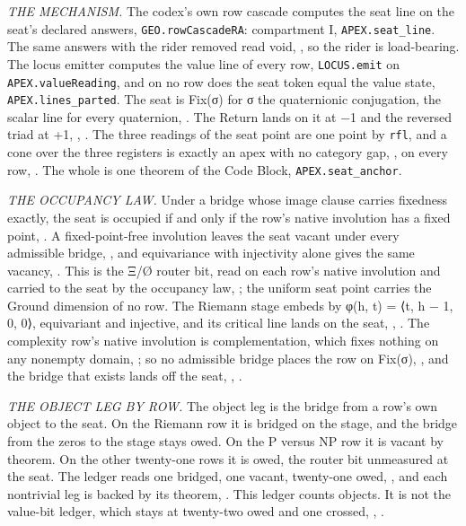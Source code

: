 \documentclass[10pt,twocolumn]{article}
\begin{document}
\emph{THE MECHANISM.} The codex's own row cascade computes the seat line
on the seat's declared answers, \texttt{GEO.rowCascadeRA}: compartment
I, \texttt{APEX.seat\_line}. The same answers with the rider removed
read void, \texttt{}, so
the rider is load-bearing. The locus emitter computes the value line of
every row, \texttt{LOCUS.emit} on \texttt{APEX.valueReading}, and on no
row does the seat token equal the value state,
\texttt{APEX.lines\_parted}. The seat is Fix(σ) for σ the quaternionic
conjugation, the scalar line for every quaternion,
\texttt{}. The Return lands on it at −1
and the reversed triad at +1,
\texttt{},
\texttt{}. The three readings of
the seat point are one point by \texttt{rfl}, and a cone over the three
registers is exactly an apex with no category gap,
\texttt{}, on every row,
\texttt{}. The whole is one theorem
of the Code Block, \texttt{APEX.seat\_anchor}.

\emph{THE OCCUPANCY LAW.} Under a bridge whose image clause carries
fixedness exactly, the seat is occupied if and only if the row's native
involution has a fixed point,
\texttt{}. A
fixed-point-free involution leaves the seat vacant under every
admissible bridge, \texttt{}, and
equivariance with injectivity alone gives the same vacancy,
\texttt{}. This is the Ξ/Ø
router bit, read on each row's native involution and carried to the seat
by the occupancy law, \texttt{};
the uniform seat point carries the Ground dimension of no row. The
Riemann stage embeds by φ(h, t) = ⟨t, h − 1, 0, 0⟩, equivariant and
injective, and its critical line lands on the seat,
\texttt{},
\texttt{}. The complexity row's
native involution is complementation, which fixes nothing on any
nonempty domain, \texttt{}; so no
admissible bridge places the row on Fix(σ),
\texttt{}, and the bridge that exists
lands off the seat, \texttt{},
\texttt{}.

\emph{THE OBJECT LEG BY ROW.} The object leg is the bridge from a row's
own object to the seat. On the Riemann row it is bridged on the stage,
and the bridge from the zeros to the stage stays owed. On the P versus
NP row it is vacant by theorem. On the other twenty-one rows it is owed,
the router bit unmeasured at the seat. The ledger reads one bridged, one
vacant, twenty-one owed, \texttt{},
and each nontrivial leg is backed by its theorem,
\texttt{}. This ledger counts
objects. It is not the value-bit ledger, which stays at twenty-two owed
and one crossed, \texttt{},
\texttt{}.
\end{document}
